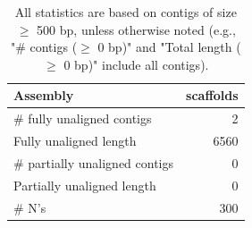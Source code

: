 \documentclass[12pt,a4paper]{article}
\begin{document}
\begin{table}[ht]
\begin{center}
\caption{All statistics are based on contigs of size $\geq$ 500 bp, unless otherwise noted (e.g., "\# contigs ($\geq$ 0 bp)" and "Total length ($\geq$ 0 bp)" include all contigs).}
\begin{tabular}{|l*{1}{|r}|}
\hline
Assembly & scaffolds \\ \hline
\# fully unaligned contigs & 2 \\ \hline
Fully unaligned length & 6560 \\ \hline
\# partially unaligned contigs & 0 \\ \hline
Partially unaligned length & 0 \\ \hline
\# N's & 300 \\ \hline
\end{tabular}
\end{center}
\end{table}
\end{document}
